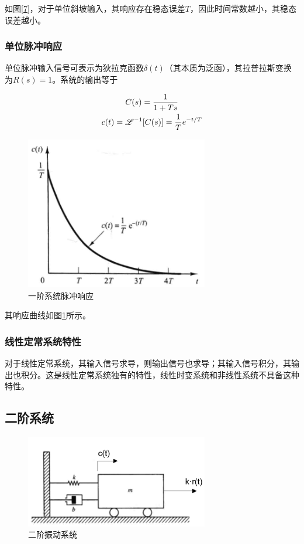 如图\ref{7}，对于单位斜坡输入，其响应存在稳态误差$T$，因此时间常数越小，其稳态误差越小。

\subsubsection{单位脉冲响应}

单位脉冲输入信号可表示为狄拉克函数$\delta(t)$（其本质为泛函），其拉普拉斯变换为$R(s)=1$。系统的输出等于

\begin{gather*}
C(s)=\frac{1}{1+Ts}\\
c(t)=\mathscr{L}^{-1}[C(s)]=\frac{1}{T}e^{-t/T}
\end{gather*}

\begin{figure}[!ht]
	\centering
	\includegraphics[width=8cm]{figures/8.png}
	\caption{一阶系统脉冲响应}
	\label{8}
\end{figure}

其响应曲线如图\ref{8}所示。

\subsubsection{线性定常系统特性}

对于线性定常系统，其输入信号求导，则输出信号也求导；其输入信号积分，其输出也积分。这是线性定常系统独有的特性，线性时变系统和非线性系统不具备这种特性。

\subsection{二阶系统}

\begin{figure}[!ht]
	\centering
	\includegraphics[width=8cm]{figures/9.png}
	\caption{二阶振动系统}
	\label{9}
\end{figure}

